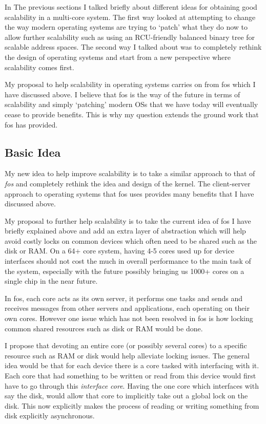 \documentclass[journal]{IEEEtran}
\begin{document}
In The previous sections I talked briefly about different ideas for obtaining good scalability in a multi-core system. The first way looked at attempting to change the way modern operating systems are trying to `patch' what they do now to allow further scalability such as using an RCU-friendly balanced binary tree for scalable address spaces. The second way I talked about was to completely rethink the design of operating systems and start from a new perspective where scalability comes first. 

My proposal to help scalability in operating systems carries on from fos which I have discussed above. I believe that fos is the way of the future in terms of scalability and simply `patching' modern OSs that we have today will eventually cease to provide benefits. This is why my question extends the ground work that fos has provided.

\subsection{Basic Idea}
My new idea to help improve scalability is to take a similar approach to that of \emph{fos} \cite{fos} and completely rethink the idea and design of the kernel. The client-server approach to operating systems that fos uses provides many benefits that I have discussed above. 

My proposal to further help scalability is to take the current idea of fos I have briefly explained above and add an extra layer of abstraction which will help avoid costly locks on common devices which often need to be shared such as the disk or RAM. On a 64+ core system, having 4-5 cores used up for device interfaces should not cost the much in overall performance to the main task of the system, especially with the future possibly bringing us 1000+ cores on a single chip in the near future. 

In fos, each core acts as its own server, it performs one tasks and sends and receives messages from other servers and applications, each operating on their own cores. However one issue which has not been resolved in fos is how locking common shared resources such as disk or RAM would be done. 

I propose that devoting an entire core (or possibly several cores) to a specific resource such as RAM or disk would help alleviate locking issues. The general idea would be that for each device there is a core tasked with interfacing with it. Each core that had something to be written or read from this device would first have to go through this \emph{interface core}. Having the one core which interfaces with say the disk, would allow that core to implicitly take out a global lock on the disk. This now explicitly makes the process of reading or writing something from disk explicitly asynchronous. 
\end{document}
